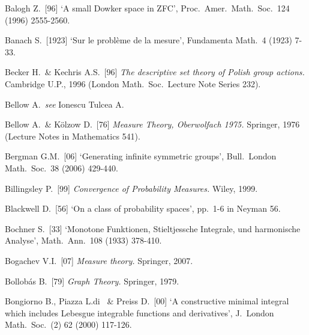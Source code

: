 {


\medskip%

Balogh Z.\ [96] `A small Dowker space in ZFC', Proc.\ Amer.\ Math.\
Soc.\ 124 (1996) 2555-2560.
\cmmnt{[439O.]}

Banach S.\ [1923] `Sur le probl\`eme de la mesure',
Fundamenta Math.\ 4 (1923) 7-33.
\cmmnt{[449O.]}

Becker H.\ \& Kechris A.S.\ [96] {\it The descriptive set theory of
Polish group actions.}  Cambridge U.P., 1996 (London Math.\ Soc.\
Lecture Note Series 232).  \cmmnt{[424H, 448P, \S448 {\it notes\/}.]}

Bellow A.\ {\it see} Ionescu Tulcea A.

Bellow A.\ \& K\"olzow D.\ [76] {\it Measure Theory, Oberwolfach 1975.}
Springer, 1976 (Lecture Notes in Mathematics 541).

Bergman G.M.\ [06] `Generating infinite symmetric groups', Bull.\ London
Math.\ Soc.\ 38 (2006) 429-440.
\cmmnt{[\S494 {\it notes}.]}

Billingsley P.\ [99] {\it Convergence of Probability Measures.}  Wiley,
1999.
\cmmnt{[\S4A3 {\it notes}.]}

Blackwell D.\ [56] `On a class of probability spaces',
pp.\ 1-6 in {\smc Neyman 56}.
\cmmnt{[419K, 452P.]}

Bochner S.\ [33] `Monotone Funktionen, Stieltjessche Integrale, und
harmonische Analyse', Math.\ Ann.\ 108 (1933) 378-410.
\cmmnt{[445N.]}

Bogachev V.I.\ [07] {\it Measure theory.}  Springer, 2007.
\cmmnt{[437Q, 437Xs, 437Yo, 437Yu, 457K.]}

Bollob\'as B.\ [79] {\it Graph Theory.}   Springer, 1979.
\cmmnt{[4A1G, 4A4N.]}

Bongiorno B., Piazza L.di \ \& Preiss D.\ [00]
`A constructive minimal integral which includes Lebesgue integrable
functions and derivatives', J.\ London Math.\ Soc.\ (2) 62 (2000) 117-126.
\cmmnt{[483Yi.]}

}
